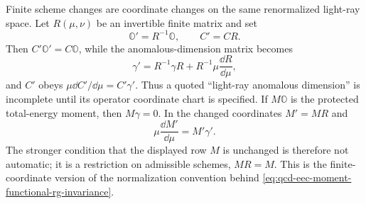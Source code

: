 Finite scheme changes are coordinate changes on the same renormalized
light-ray space.  Let \(R(\mu,\nu)\) be an invertible finite matrix and set
\[
  \mathbb O'=R^{-1}\mathbb O,\qquad C'=C R .
\]
Then \(C'\mathbb O'=C\mathbb O\), while the anomalous-dimension matrix
becomes
\begin{equation}
  \gamma'
  =
  R^{-1}\gamma R
  +
  R^{-1}\mu\frac{\dd R}{\dd\mu},
  \label{eq:qcd-eec-finite-chart-scheme-gamma}
\end{equation}
and \(C'\) obeys \(\mu\dd C'/\dd\mu=C'\gamma'\).  Thus a quoted
``light-ray anomalous dimension'' is incomplete until its operator coordinate
chart is specified.  If \(M\mathbb O\) is the protected total-energy moment,
then \(M\gamma=0\).  In the changed coordinates \(M'=M R\) and
\[
  \mu\frac{\dd M'}{\dd\mu}=M'\gamma' .
\]
The stronger condition that the displayed row \(M\) is unchanged is therefore
not automatic; it is a restriction on admissible schemes, \(M R=M\).  This is
the finite-coordinate version of the normalization convention behind
\eqref{eq:qcd-eec-moment-functional-rg-invariance}.

